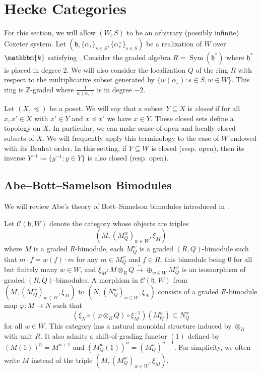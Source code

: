 \documentclass{amsart}
\newcommand{\Z}{\mathbb{Z}}
\renewcommand{\k}{\mathbbm{k}}
\newcommand{\scrC}{\mathcal{C}}
\newcommand{\fr}[1]{\mathfrak{#1}}
\DeclareMathOperator{\Sym}{Sym}
\theoremstyle{definition}
\begin{document}
        \section{Hecke Categories}

        For this section, we will allow $(W, S)$ to be an arbitrary (possibly infinite) Coxeter system.
        Let $(\fr{h}, \{\alpha_s\}_{s \in S}, \{\alpha_s^{\vee}\}_{s \in S})$ be a realization of $W$ over $\k$ satisfying \cite[Assumption 3.5]{Abe21}.
        Consider the graded algebra $R = \Sym (\fr{h}^*)$ where $\fr{h}^*$ is placed in degree $2$.
        We will also consider the localization $Q$ of the ring $R$ with respect to the multiplicative subset generated by $\{w (\alpha_s) : s\in S, w \in W\}$.
        This ring is $\Z$-graded where $\frac{1}{w (\alpha_s)}$ is in degree $-2$.

        Let $(X, \preceq)$ be a poset. We will say that a subset $Y \subseteq X$ is \emph{closed} if for all $x,x' \in X$ with $x' \in Y$ and $x \preceq x'$ we have $x \in Y$.
        These closed sets define a topology on $X$. In particular, we can make sense of open and locally closed subsets of $X$.
        We will frequently apply this terminology to the case of $W$ endowed with its Bruhat order. In this setting, if $Y \subseteq W$ is closed (resp. open), then its inverse $Y^{-1} \coloneq \{ y^{-1} : y \in Y \}$ is also closed (resp. open).  

        \subsection{Abe--Bott--Samelson Bimodules}

        We will review Abe's theory of Bott--Samelson bimodules introduced in \cite{Abe19}.

        Let $\scrC (\fr{h}, W)$ denote the category whose objects are triples
        \[(M, (M_Q^w)_{w \in W}, \xi_M)\]
        where $M$ is a graded $R$-bimodule, each $M_Q^w$ is a graded $(R,Q)$-bimodule such that $m \cdot f = w(f) \cdot m$ for any $m \in M_Q^w$ and $f \in R$, this bimodule being 0 for all but finitely many $w\in W$, and $\xi_M : M \otimes_R Q \stackrel{\sim}{\to} \oplus_{w \in W} M_Q^w$ is an isomorphism of graded $(R,Q)$-bimodules.
        A morphism in $\scrC( \fr{h}, W)$ from $(M, (M_Q^w)_{w \in W}, \xi_M)$ to $(N, (N_Q^w)_{w \in W}, \xi_N)$ consists of a graded $R$-bimodule map $\varphi : M \to N$ such that 
        \[(\xi_N \circ (\varphi \otimes_R Q) \circ \xi_M^{-1}) (M_Q^w) \subset N_Q^w\]
        for all $w \in W$.
        This category has a natural monoidal structure induced by $\otimes_R$ with unit $R$. It also admits a shift-of-grading functor $(1)$ defined by $(M(1))^n = M^{n+1}$ and $(M_Q^w (1))^n = (M_Q^w)^{n+1}$.
        For simplicity, we often write $M$ instead of the triple $(M, (M_Q^w)_{w \in W}, \xi_M)$.
\end{document}
